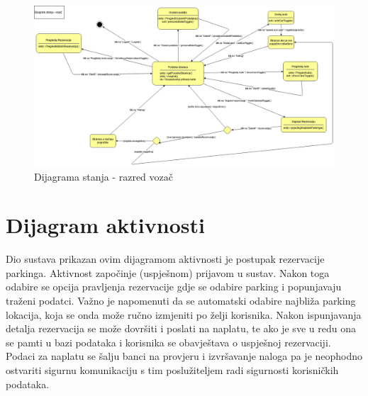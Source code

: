 					\begin{figure}[H]
						\includegraphics[scale=0.35]{dijagrami/dijagram stanja.png} %
						\centering
						\caption{Dijagrama stanja - razred vozač}
						\label{fig:promjene}
					\end{figure}
			
			\eject 
		
		\section{Dijagram aktivnosti}
			 
			 Dio sustava prikazan ovim dijagramom aktivnosti je postupak rezervacije parkinga. Aktivnost započinje (uspješnom) prijavom u sustav. Nakon toga odabire se opcija pravljenja rezervacije gdje se odabire parking i popunjavaju traženi podatci. Važno je napomenuti da se automatski odabire najbliža parking lokacija, koja se onda može ručno izmjeniti po želji korisnika. Nakon ispunjavanja detalja rezervacija se može dovršiti i poslati na naplatu, te ako je sve u redu ona se pamti u bazi podataka i korisnika se obavještava o uspješnoj rezervaciji. Podaci za naplatu se šalju banci na provjeru i izvršavanje naloga pa je neophodno ostvariti sigurnu komunikaciju s tim poslužiteljem radi sigurnosti korisničkih podataka.
			
